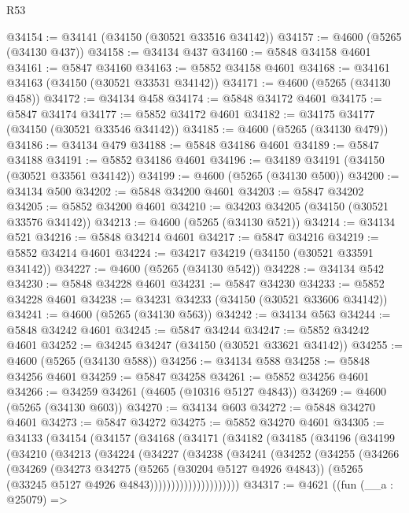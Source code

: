 \begin{lexlean}{R53}
\begin{coremodule}
@34154 := @34141 (@34150 (@30521 @33516 @34142))
@34157 := @4600 (@5265 (@34130 @437))
@34158 := @34134 @437
@34160 := @5848 @34158 @4601
@34161 := @5847 @34160
@34163 := @5852 @34158 @4601
@34168 := @34161 @34163 (@34150 (@30521 @33531 @34142))
@34171 := @4600 (@5265 (@34130 @458))
@34172 := @34134 @458
@34174 := @5848 @34172 @4601
@34175 := @5847 @34174
@34177 := @5852 @34172 @4601
@34182 := @34175 @34177 (@34150 (@30521 @33546 @34142))
@34185 := @4600 (@5265 (@34130 @479))
@34186 := @34134 @479
@34188 := @5848 @34186 @4601
@34189 := @5847 @34188
@34191 := @5852 @34186 @4601
@34196 := @34189 @34191 (@34150 (@30521 @33561 @34142))
@34199 := @4600 (@5265 (@34130 @500))
@34200 := @34134 @500
@34202 := @5848 @34200 @4601
@34203 := @5847 @34202
@34205 := @5852 @34200 @4601
@34210 := @34203 @34205 (@34150 (@30521 @33576 @34142))
@34213 := @4600 (@5265 (@34130 @521))
@34214 := @34134 @521
@34216 := @5848 @34214 @4601
@34217 := @5847 @34216
@34219 := @5852 @34214 @4601
@34224 := @34217 @34219 (@34150 (@30521 @33591 @34142))
@34227 := @4600 (@5265 (@34130 @542))
@34228 := @34134 @542
@34230 := @5848 @34228 @4601
@34231 := @5847 @34230
@34233 := @5852 @34228 @4601
@34238 := @34231 @34233 (@34150 (@30521 @33606 @34142))
@34241 := @4600 (@5265 (@34130 @563))
@34242 := @34134 @563
@34244 := @5848 @34242 @4601
@34245 := @5847 @34244
@34247 := @5852 @34242 @4601
@34252 := @34245 @34247 (@34150 (@30521 @33621 @34142))
@34255 := @4600 (@5265 (@34130 @588))
@34256 := @34134 @588
@34258 := @5848 @34256 @4601
@34259 := @5847 @34258
@34261 := @5852 @34256 @4601
@34266 := @34259 @34261 (@4605 (@10316 @5127 @4843))
@34269 := @4600 (@5265 (@34130 @603))
@34270 := @34134 @603
@34272 := @5848 @34270 @4601
@34273 := @5847 @34272
@34275 := @5852 @34270 @4601
@34305 := @34133
    (@34154
      (@34157
        (@34168
          (@34171
            (@34182
              (@34185
                (@34196
                  (@34199
                    (@34210
                      (@34213
                        (@34224
                          (@34227
                            (@34238
                              (@34241
                                (@34252
                                  (@34255
                                    (@34266
                                      (@34269
                                        (@34273
                                          @34275
                                          (@5265 (@30204 @5127 @4926 @4843))
                                          (@5265 (@33245 @5127 @4926 @4843)))))))))))))))))))))
@34317 := @4621
    ((fun (__a : @25079) =>

\end{coremodule}
\end{lexlean}

